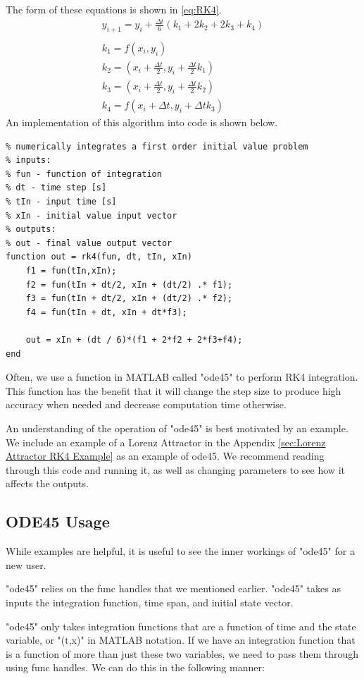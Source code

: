 \documentclass[12pt]{report}
\begin{document}
The form of these equations is shown in \eqref{eq:RK4}.
\begin{gather}\label{eq:RK4}
    y_{i+1}=y_i+\frac{\Delta t}{6}\left(k_1+2k_2+2k_3+k_4\right)\\\\
    k_1=f(x_i,y_i)\\
    k_2=\left(x_i+\frac{\Delta t}{2},y_i+\frac{\Delta t}{2}k_1\right)\\
    k_3=\left(x_i+\frac{\Delta t}{2},y_i+\frac{\Delta t}{2}k_2\right)\\
    k_4=f(x_i+\Delta t,y_i+\Delta tk_3)
\end{gather}
An implementation of this algorithm into code is shown below.
\begin{lstlisting}[style=Matlab-editor, caption=RK4 Integrator]
%% RK4 Integrator
% numerically integrates a first order initial value problem
% inputs:
% fun - function of integration
% dt - time step [s]
% tIn - input time [s]
% xIn - initial value input vector
% outputs:
% out - final value output vector
function out = rk4(fun, dt, tIn, xIn)
    f1 = fun(tIn,xIn);
    f2 = fun(tIn + dt/2, xIn + (dt/2) .* f1);
    f3 = fun(tIn + dt/2, xIn + (dt/2) .* f2);
    f4 = fun(tIn + dt, xIn + dt*f3);
    
    out = xIn + (dt / 6)*(f1 + 2*f2 + 2*f3+f4);
end
\end{lstlisting}\label{code:rk4}
Often, we use a function in MATLAB called "ode45" to perform RK4 integration. This function has the benefit that it will change the step size to produce high accuracy when needed and decrease computation time otherwise.

An understanding of the operation of "ode45" is best motivated by an example. We include an example of a Lorenz Attractor in the Appendix \ref{sec:Lorenz Attractor RK4 Example} as an example of ode45. We recommend reading through this code and running it, as well as changing parameters to see how it affects the outputs.
\subsection{ODE45 Usage}
While examples are helpful, it is useful to see the inner workings of "ode45" for a new user. 

"ode45" relies on the \glspl{func handle} that we mentioned earlier. "ode45" takes as inputs the integration function, time span, and initial \gls{state vector}.

"ode45" only takes integration functions that are a function of time and the state variable, or "(t,x)" in MATLAB notation. If we have an integration function that is a function of more than just these two variables, we need to pass them through using \glspl{func handle}. We can do this in the following manner:
\end{document}
